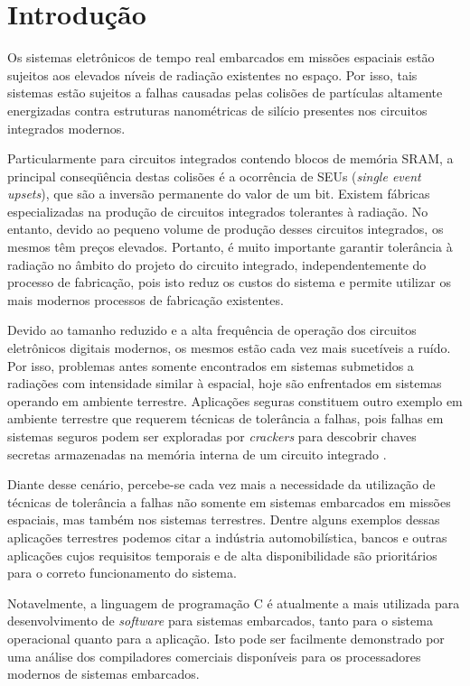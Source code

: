 \documentclass[10pt,twocolumn]{article}
\begin{document}
\section{Introdução}
	Os sistemas eletrônicos de tempo real embarcados em missões espaciais estão sujeitos aos elevados níveis de radiação existentes no espaço. Por isso, tais sistemas estão sujeitos a falhas causadas pelas colisões de partículas altamente energizadas contra estruturas nanométricas de silício presentes nos circuitos integrados modernos.

	Particularmente para circuitos integrados contendo blocos de memória SRAM, a principal conseqüência destas colisões é a ocorrência de SEUs (\emph{single event upsets}), que são  a inversão permanente do valor de um bit. Existem fábricas especializadas na produção de circuitos integrados tolerantes à radiação. No entanto, devido ao pequeno volume de produção desses circuitos integrados, os mesmos têm preços elevados. Portanto, é muito importante garantir tolerância à radiação no âmbito do projeto do circuito integrado, independentemente do processo de fabricação, pois isto reduz os custos do sistema e permite utilizar os mais modernos processos de fabricação existentes.

	Devido ao tamanho reduzido e a alta frequência de operação dos circuitos eletrônicos digitais modernos, os mesmos estão cada vez mais sucetíveis a ruído. Por isso, problemas antes somente encontrados em sistemas submetidos a radiações com intensidade similar à espacial, hoje são enfrentados em sistemas operando em ambiente terrestre. Aplicações seguras constituem outro exemplo em ambiente terrestre que requerem técnicas de tolerância a falhas, pois falhas em sistemas seguros podem ser exploradas por \emph{crackers} para descobrir chaves secretas armazenadas na memória interna de um circuito integrado \cite{RSAFaultAttack}.

	Diante desse cenário, percebe-se cada vez mais a necessidade da utilização de técnicas de tolerância a falhas não somente em sistemas embarcados em missões espaciais, mas também nos sistemas terrestres. Dentre alguns exemplos dessas aplicações terrestres podemos citar a indústria automobilística, bancos e outras aplicações cujos requisitos temporais e de alta disponibilidade são prioritários para o correto funcionamento do sistema.

	Notavelmente, a linguagem de programação {C} é atualmente a mais utilizada para desenvolvimento de \emph{software} para sistemas embarcados, tanto para o sistema ope\-ra\-cio\-nal quanto para a aplicação. Isto pode ser facilmente demonstrado por uma análise dos compiladores comerciais disponíveis para os processadores modernos de sistemas embarcados.
\end{document}

